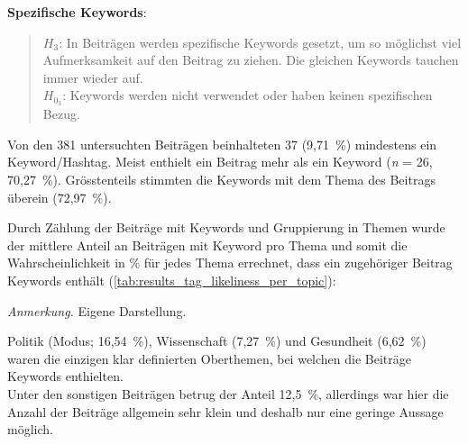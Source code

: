 \documentclass[12pt,a4paper]{article}        %
\begin{document}
\textbf{Spezifische Keywords}:
\begin{quote}
  \(H_3\): In Beiträgen werden spezifische Keywords gesetzt, um so möglichst viel Aufmerksamkeit auf den Beitrag zu ziehen. Die gleichen Keywords tauchen immer wieder auf.\\
  \(H_{0_3}\): Keywords werden nicht verwendet oder haben keinen spezifischen Bezug.
\end{quote}
Von den 381 untersuchten Beiträgen beinhalteten 37 (9,71 \%) mindestens ein Keyword/Hashtag. Meist enthielt ein Beitrag mehr als ein Keyword (\textit{n} = 26, 70,27 \%). Grösstenteils stimmten die Keywords mit dem Thema des Beitrags überein (72,97 \%).

Durch Zählung der Beiträge mit Keywords und Gruppierung in Themen wurde der mittlere Anteil an Beiträgen mit Keyword pro Thema und somit die Wahrscheinlichkeit in \% für jedes Thema errechnet, dass ein zugehöriger Beitrag Keywords enthält (\ref{tab:results_tag_likeliness_per_topic}):
\begin{table}[H]
  \caption{\textit{Statistische Wahrscheinlichkeit pro Themenbeitrag, ein Keyword zu enthalten}}
  \label{tab:results_tag_likeliness_per_topic}
  \centering
\footnotesize\textit{Anmerkung.} Eigene Darstellung.
\end{table}
Politik (Modus; 16,54 \%), Wissenschaft (7,27 \%) und Gesundheit (6,62 \%) waren die einzigen klar definierten Oberthemen, bei welchen die Beiträge Keywords enthielten. \\
Unter den sonstigen Beiträgen betrug der Anteil 12,5 \%, allerdings war hier die Anzahl der Beiträge allgemein sehr klein und deshalb nur eine geringe Aussage möglich.
\end{document}
